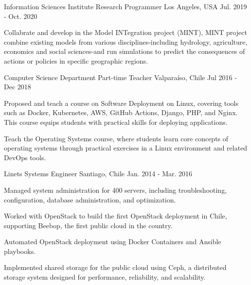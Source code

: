 \begin{cventries}
  \cventry
    {Information Sciences Institute}
    {Research Programmer}
    {Los Angeles, USA}
    {Jul. 2019 - Oct. 2020}
    {
      \begin{cvitems}
        \item{Collabrate and develop in the Model INTegration project (MINT), MINT project combine existing models from various disciplines-including hydrology, agriculture, economics and social sciences-and run simulations to predict the consequences of actions or policies in specific geographic regions.}
      \end{cvitems}
    }

    \cventry
    {Computer Science Department}
    {Part-time Teacher}
    {Valparaíso, Chile}
    {Jul 2016 - Dec 2018}
    {
      \begin{cvitems}
        \item{Proposed and teach a course on Software Deployment on Linux, covering tools such as Docker, Kubernetes, AWS, GitHub Actions, Django, PHP, and Nginx. This course equips students with practical skills for deploying applications.}
        \item{Teach the Operating Systems course, where students learn core concepts of operating systems through practical exercises in a Linux environment and related DevOps tools.}
      \end{cvitems}
    }


  \cventry
    {Linets}
    {Systems Engineer}
    {Santiago, Chile}
    {Jan. 2014 - Mar. 2016}
    {
      \begin{cvitems}
        \item{Managed system administration for 400 servers, including troubleshooting, configuration, database administration, and optimization.}
        \item{Worked with OpenStack to build the first OpenStack deployment in Chile, supporting Beebop, the first public cloud in the country.}
        \item{Automated OpenStack deployment using Docker Containers and Ansible playbooks.}
        \item{Implemented shared storage for the public cloud using Ceph, a distributed storage system designed for performance, reliability, and scalability.}
      \end{cvitems}
    }


\end{cventries}
